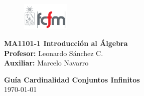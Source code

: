 \documentclass[letterpaper,11pt]{article}
\theoremstyle{plain}
\begin{document}
\newpage
\pagestyle{fancy}
\fancyhf{}
\fancyfoot{}
\fancyfoot[C]{\thepage}
\hypersetup{pdfborder = 0 0 0}
\begin{figure} %
    \vspace{-5mm}
    \includegraphics[width=0.2\textwidth]{img/fcfm2.png}
\end{figure}

\noindent
\textbf{MA1101-1 Introducción al Álgebra}\\
\textbf{Profesor: }Leonardo Sánchez C.\\
\textbf{Auxiliar: }Marcelo Navarro

\begin{center}
{\bf \Large Guía Cardinalidad Conjuntos Infinitos}\\
{\today}
\end{center}
\end{document}

